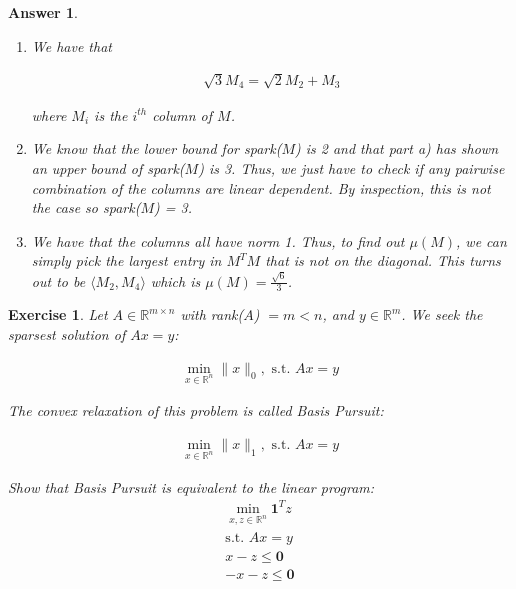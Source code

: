 \documentclass[12pt]{article}
\theoremstyle{colon}
\newtheorem{exercise}{Exercise}
\newtheorem*{answer}{Answer}
\begin{document}
\begin{answer}
  \

  \begin{enumerate}[label=\alph*)]
    \item We have that

      \begin{gather*}
        \sqrt{3} M_4 = \sqrt{2}M_2 + M_3
      \end{gather*}

      where $M_i$ is the $i^{th}$ column of $M$.

    \item We know that the lower bound for spark($M$) is 2 and that part a) has shown an upper bound of spark($M$) is 3. Thus, we just have to check if any pairwise combination of the columns are linear dependent. By inspection, this is not the case so spark($M$) = 3.

    \item We have that the columns all have norm 1. Thus, to find out $\mu(M)$, we can simply pick the largest entry in $M^T M$ that is not on the diagonal. This turns out to be $\langle M_2, M_4 \rangle$ which is $\mu(M) = \frac{\sqrt{6}}{3}$.

  \end{enumerate}

\end{answer}

\clearpage

\begin{exercise}
  Let $A \in \mathbb{R}^{m \times n}$ with rank($A$) $= m < n$, and $y \in \mathbb{R}^m$. We seek the sparsest solution of $Ax = y$:

  \begin{gather*}
    \min_{x \in \mathbb{R}^n} \lVert x \rVert_0, \text{ s.t. } Ax = y
  \end{gather*}

  The convex relaxation of this problem is called Basis Pursuit:

  \begin{gather*}
    \min_{x \in \mathbb{R}^n} \lVert x \rVert_1, \text{ s.t. } Ax = y
  \end{gather*}

  Show that Basis Pursuit is equivalent to the linear program:
  \begin{gather*}
    \min_{x, z \in \mathbb{R}^n} \bm{1}^T z\\
    \text{s.t. } Ax = y \\
    x - z \leq \bm{0} \\
    -x - z \leq \bm{0}
  \end{gather*}
\end{exercise}
\end{document}
